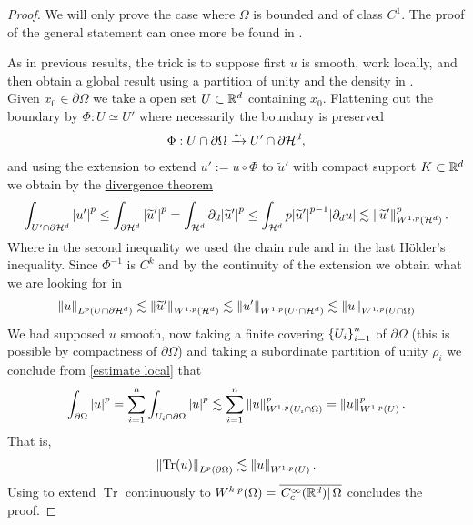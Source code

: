 \documentclass[
    a4paper,
    DIV=14,
    abstract=true,
    numbers=noenddot
]{scrartcl}
\begin{document}
\begin{proof}
	We will only prove the case where $\Omega$ is bounded and of class $C^1$. The proof of the general statement can once more be found in \cite[page 592]{leoni2017first}.

	As in previous results, the trick is to suppose first $u$ is smooth, work locally, and then obtain a global result using a partition of unity and the density in . \\

	Given $x_0 \in \partial  \Omega$ we take a open set $U \subset \mathbb{R}^d$ containing $x_0$. Flattening out the boundary by $\Phi : U \simeq U'$ where necessarily the boundary is preserved
	\begin{align*}
		\Phi: U \cap  \partial \Omega\xrightarrow{\sim} U' \cap \partial  \mathcal{H}^d,
	\end{align*}
	and using the extension  to extend $u':= u\circ \Phi$ to $\widetilde{u}'$ with compact support $K \subset \mathbb{R}^d $  we obtain by the \href{https://en.wikipedia.org/wiki/Divergence_theorem#:~:text=space%5Bedit%5D-,We,-are%20going%20to%20prove}{divergence theorem}
	\begin{align*}
		\int_{U'\cap \partial \mathcal{H}^d}{\left| u' \right|}^p  \leq\int_{\partial \mathcal{H}^d} {\left| \widetilde{u}' \right|}^p=\int_{\mathcal{H}^d} \partial_{d} {\left| \widetilde{u}' \right|}^p\leq\int_{\mathcal{H}^d} p{\left| \widetilde{u}' \right|}^{p-1}{\left| \partial_{d} u \right|}   \lesssim \left\lVert \widetilde{u}' \right\rVert_{W^{1,p}(\mathcal{H}^d)}^p  .
	\end{align*}
	Where in the second inequality we used the chain rule and in the last Hölder's inequality.
	Since $\Phi^{-1}$ is $C^k$ and by the continuity of the extension we obtain what we are looking for in
	\begin{align}\label{estimate local}
		\left\lVert u \right\rVert_{L^p(U \cap \partial \mathcal{H}^d)}\lesssim \left\lVert \widetilde{u}' \right\rVert_{W^{1,p}(\mathcal{H}^d)}\lesssim \left\lVert u' \right\rVert_{W^{1,p}(U'\cap \mathcal{H}^d)}\lesssim  \left\lVert u \right\rVert_{W^{1,p}(U\cap \Omega)}
	\end{align}
	We had supposed $u$ smooth, now taking a finite covering $\left\{U_i\right\}_{i=1}^n $ of $\partial  \Omega$ (this is possible by compactness of $\partial  \Omega$) and taking a subordinate partition of unity  $\rho _i$ we conclude from \eqref{estimate local}  that
	\begin{align*}
		\int_{\partial \Omega} {\left| u \right|}^p  =\sum_{i=1}^n \int_{ U_i \cap \partial \Omega} {\left| u \right|}^p \lesssim \sum_{i=1}^n \left\lVert u \right\rVert_{W^{1,p}(U_i \cap \Omega)}^p =\left\lVert u \right\rVert_{W^{1,p}(U)}^p .
	\end{align*}
	That is,
	\begin{align*}
		\left\lVert \operatorname{Tr}(u) \right\rVert_{L^p( \partial \Omega)}\lesssim  \left\lVert u \right\rVert_{W^{1,p}(U)} .
	\end{align*}
	Using  to extend $\operatorname{Tr}$ continuously to $W^{k,p}(\Omega)= \overline{\left.C_c^\infty(\mathbb{R}^d)\right|{\Omega}}$ concludes the proof.
\end{proof}
\end{document}
